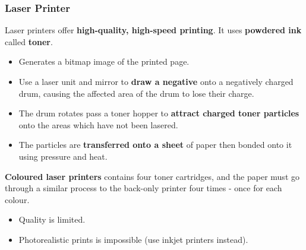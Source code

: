 \subsubsection*{Laser Printer}

Laser printers offer \textbf{high-quality, high-speed printing}. It uses \textbf{powdered ink} called \textbf{toner}.
\begin{itemize}
    \item Generates a bitmap image of the printed page.
    \item Use a laser unit and mirror to \textbf{draw a negative} onto a negatively charged drum, causing the affected area of the drum to lose their charge.
    \item The drum rotates pass a toner hopper to \textbf{attract charged toner particles} onto the areas which have not been lasered.
    \item The particles are \textbf{transferred onto a sheet} of paper then bonded onto it using pressure and heat.
\end{itemize}

\textbf{Coloured laser printers} contains four toner cartridges, and the paper must go through a similar process to the back-only printer four times - once for each colour.
\begin{itemize}
    \item Quality is limited.
    \item Photorealistic prints is impossible (use inkjet printers instead).
\end{itemize}
